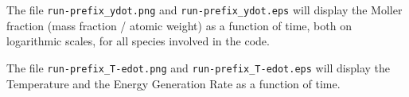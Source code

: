 The file {\tt run-prefix\_ydot.png} and {\tt run-prefix\_ydot.eps} will display the Moller fraction (mass fraction / atomic weight) as a function of time, both on logarithmic scales, for all species involved in the code. 

The file {\tt run-prefix\_T-edot.png} and {\tt run-prefix\_T-edot.eps} will display the Temperature and the Energy Generation Rate as a function of time. 
